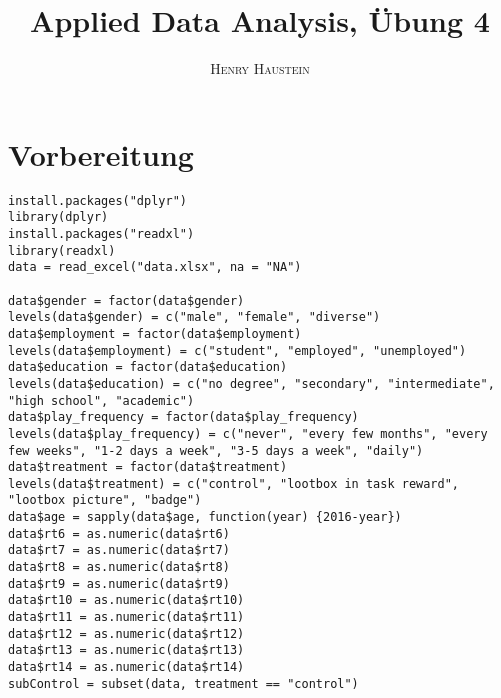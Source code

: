 \documentclass{article}
\title{\textbf{Applied Data Analysis, Übung 4}}
\author{\textsc{Henry Haustein}}
\date{}
\begin{document}
	\maketitle
	
	\section*{Vorbereitung}
	\begin{lstlisting}
install.packages("dplyr")
library(dplyr)
install.packages("readxl")
library(readxl)
data = read_excel("data.xlsx", na = "NA")

data$gender = factor(data$gender)
levels(data$gender) = c("male", "female", "diverse")
data$employment = factor(data$employment)
levels(data$employment) = c("student", "employed", "unemployed")
data$education = factor(data$education)
levels(data$education) = c("no degree", "secondary", "intermediate", "high school", "academic")
data$play_frequency = factor(data$play_frequency)
levels(data$play_frequency) = c("never", "every few months", "every few weeks", "1-2 days a week", "3-5 days a week", "daily")
data$treatment = factor(data$treatment)
levels(data$treatment) = c("control", "lootbox in task reward", "lootbox picture", "badge")
data$age = sapply(data$age, function(year) {2016-year})
data$rt6 = as.numeric(data$rt6)
data$rt7 = as.numeric(data$rt7)
data$rt8 = as.numeric(data$rt8)
data$rt9 = as.numeric(data$rt9)
data$rt10 = as.numeric(data$rt10)
data$rt11 = as.numeric(data$rt11)
data$rt12 = as.numeric(data$rt12)
data$rt13 = as.numeric(data$rt13)
data$rt14 = as.numeric(data$rt14)
subControl = subset(data, treatment == "control")
	\end{lstlisting}
	
\end{document}
